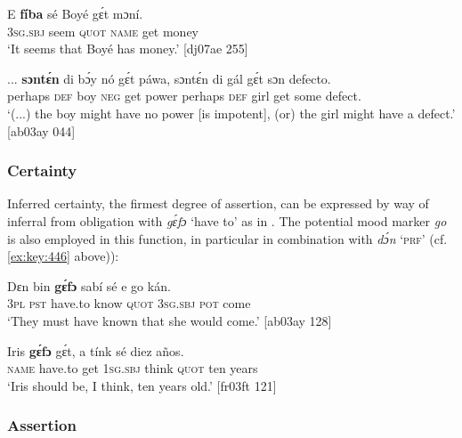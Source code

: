 \ea%
    \label{ex:key:451}
    \gll E    \textbf{fíba}    sé    Boyé  gɛ́t  mɔní. \\
\textsc{3sg.sbj}  seem  \textsc{quot}    \textsc{name}  get  money\\

\glt ‘It seems that Boyé has money.’ [dj07ae 255]
\z


\ea%
    \label{ex:key:452}
    \gll \op...\cp{}  \textbf{sɔntɛ́n}  di  bɔ́y  nó  gɛ́t  páwa,  sɔntɛ́n  di  gál
gɛ́t  sɔn    defecto.\\
{} perhaps  \textsc{def}  boy  \textsc{neg}  get  power  perhaps  \textsc{def}  girl
get  some  defect.\\

\glt ‘(...) the boy might have no power [is impotent], (or) the girl 
 might have a defect.’ [ab03ay 044]
\z

\subsubsection{Certainty}\label{sec:6.7.4.3}

Inferred certainty, the firmest degree of assertion, can be expressed by way of inferral from obligation with \textit{gɛ́fɔ} ‘have to’ as in . The potential mood{\fff} marker \textit{go} is also employed in this function, in particular in combination with \textit{dɔ́n} ‘\textsc{prf}’ (cf. \ref{ex:key:446} above)):{\fff}


\ea%
    \label{ex:key:453}
    \gll Dɛn    bin  \textbf{gɛ́fɔ}    sabí    sé    e    go  kán.\\
\textsc{3pl}    \textsc{pst}  have.to  know  \textsc{quot}    \textsc{3sg.sbj}  \textsc{pot}  come\\

\glt ‘They must have known that she would come.’ [ab03ay 128]
\z


\ea%
    \label{ex:key:454}
    \gll Iris    \textbf{gɛ́fɔ}    gɛ́t,  a    tínk    sé    diez  años.\\
\textsc{name}  have.to  get  \textsc{1sg.sbj}  think  \textsc{quot}    ten  years\\

\glt ‘Iris should be, I think, ten years old.’ [fr03ft 121]
\z

\subsubsection{Assertion}\label{sec:6.7.4.4}

